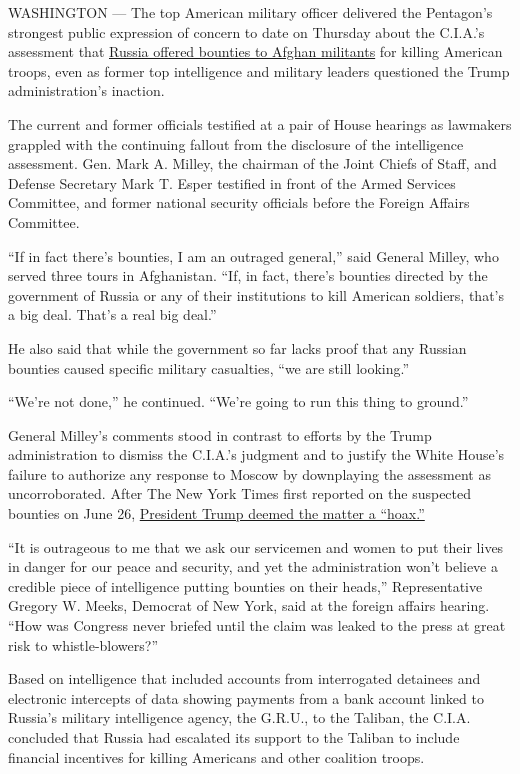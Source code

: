 WASHINGTON --- The top American military officer delivered the
Pentagon's strongest public expression of concern to date on Thursday
about the C.I.A.'s assessment that
\href{https://www.nytimes.com/2020/07/29/us/politics/trump-putin-bounties.html}{Russia
offered bounties to Afghan militants} for killing American troops, even
as former top intelligence and military leaders questioned the Trump
administration's inaction.

The current and former officials testified at a pair of House hearings
as lawmakers grappled with the continuing fallout from the disclosure of
the intelligence assessment. Gen. Mark A. Milley, the chairman of the
Joint Chiefs of Staff, and Defense Secretary Mark T. Esper testified in
front of the Armed Services Committee, and former national security
officials before the Foreign Affairs Committee.

``If in fact there's bounties, I am an outraged general,'' said General
Milley, who served three tours in Afghanistan. ``If, in fact, there's
bounties directed by the government of Russia or any of their
institutions to kill American soldiers, that's a big deal. That's a real
big deal.''

He also said that while the government so far lacks proof that any
Russian bounties caused specific military casualties, ``we are still
looking.''

``We're not done,'' he continued. ``We're going to run this thing to
ground.''

General Milley's comments stood in contrast to efforts by the Trump
administration to dismiss the C.I.A.'s judgment and to justify the White
House's failure to authorize any response to Moscow by downplaying the
assessment as uncorroborated. After The New York Times first reported on
the suspected bounties on June 26,
\href{https://twitter.com/realDonaldTrump/status/1278284552679624705}{President
Trump deemed the matter a ``hoax.''}

``It is outrageous to me that we ask our servicemen and women to put
their lives in danger for our peace and security, and yet the
administration won't believe a credible piece of intelligence putting
bounties on their heads,'' Representative Gregory W. Meeks, Democrat of
New York, said at the foreign affairs hearing. ``How was Congress never
briefed until the claim was leaked to the press at great risk to
whistle-blowers?''

Based on intelligence that included accounts from interrogated detainees
and electronic intercepts of data showing payments from a bank account
linked to Russia's military intelligence agency, the G.R.U., to the
Taliban, the C.I.A. concluded that Russia had escalated its support to
the Taliban to include financial incentives for killing Americans and
other coalition troops.

